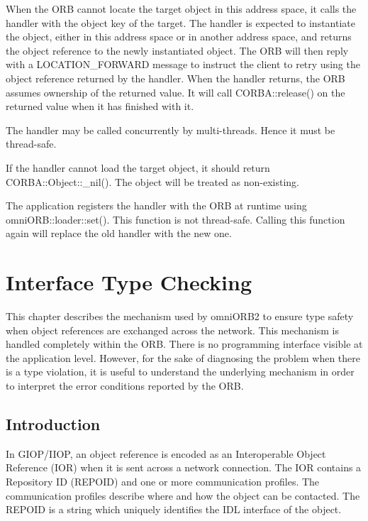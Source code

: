 \documentclass[11pt,twoside,onecolumn]{book}
\begin{document}
When the ORB cannot locate the target object in this address space, it
calls the handler with the object key of the target. The handler is expected
to instantiate the object, either in this address space or in another
address space, and returns the object reference to the newly instantiated
object. The ORB will then reply with a LOCATION\_FORWARD message to instruct
the client to retry using the object reference returned by the handler.
When the handler returns, the ORB assumes ownership of the returned
value. It will call CORBA::release() on the returned value when it has
finished with it.
                                                                      
The handler may be called concurrently by multi-threads. Hence it  
must be thread-safe.                                               
                                                                      
If the handler cannot load the target object, it should return     
CORBA::Object::\_nil(). The object will be treated as non-existing. 
                                                                      
The application registers the handler with the ORB at runtime      
using omniORB::loader::set(). This function is not thread-safe.    
Calling this function again will replace the old handler with      
the new one.                                                       
                                                                    
\chapter{Interface Type Checking}
\label{ch_intf}

This chapter describes the mechanism used by omniORB2 to ensure type safety
when object references are exchanged across the network. This mechanism is
handled completely within the ORB. There is no programming interface
visible at the application level. However, for the sake of diagnosing the
problem when there is a type violation, it is useful to understand the
underlying mechanism in order to interpret the error conditions reported by
the ORB.

\section{Introduction}

In GIOP/IIOP, an object reference is encoded as an Interoperable Object
Reference (IOR) when it is sent across a network connection. The IOR
contains a Repository ID (REPOID) and one or more communication profiles. The
communication profiles describe where and how the object can be
contacted. The REPOID is a string which uniquely identifies the
IDL interface of the object. 
\end{document}
